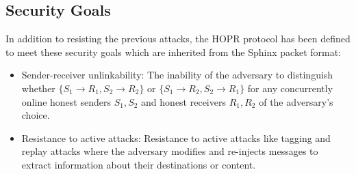 \subsection*{Security Goals}

In addition to resisting the previous attacks, the HOPR protocol has been
defined to meet these security goals which are inherited from the Sphinx packet
format:

\begin{itemize}
    \item Sender-receiver unlinkability: The inability of the adversary to distinguish whether $\{S_1\rightarrow R_1, S_2\rightarrow R_2\}$ or $\{S_1\rightarrow R_2, S_2\rightarrow R_1\}$ for any concurrently online honest senders $S_1,S_2$ and honest receivers $R_1,R_2$ of the adversary’s choice.
    \item Resistance to active attacks: Resistance to active attacks like tagging and replay attacks where the adversary modifies and re-injects messages to extract information about their destinations or content.
\end{itemize}
